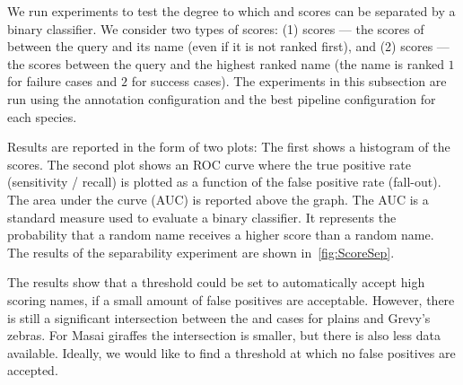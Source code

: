         We run experiments to test the degree to which \groundtrue{}
          and \groundfalse{} scores can be separated by a binary
          classifier.
        We consider two types of scores:
        (1) \groundtrue{} scores --- the scores of between the query
          and its \groundtrue{} name (even if it is not ranked first),
          and
        (2) \groundfalse{} scores --- the scores between the query and
          the highest ranked \groundfalse{} name (the \groundfalse{} name
          is ranked $1$\st{} for failure cases and $2$\nd{} for success
          cases).
        The experiments in this subsection are run using the
          \timectrl{} annotation configuration and the best pipeline
          configuration for each species.
           
        Results are reported in the form of two plots:
        The first shows a histogram of the scores.
        The second plot shows an ROC curve where the true positive rate
          (sensitivity / recall) is plotted as a function of the false
          positive rate (fall-out).
        The area under the curve (AUC) is reported above the graph.
        The AUC is a standard measure used to evaluate a binary
          classifier.
        It represents the probability that a random \groundtrue{} name
          receives a higher score than a random \groundfalse{} name.
        The results of the separability experiment are shown
          in~\cref{fig:ScoreSep}.


        \ScoreSep{}

        The results show that a threshold could be set to automatically
          accept high scoring names, if a small amount of false positives
          are acceptable.
        However, there is still a significant intersection between the
          \groundtrue{} and \groundfalse{} cases for plains and Grevy's
          zebras.
        For Masai giraffes the intersection is smaller, but there is
          also less data available.
        Ideally, we would like to find a threshold at which no false
          positives are accepted.

